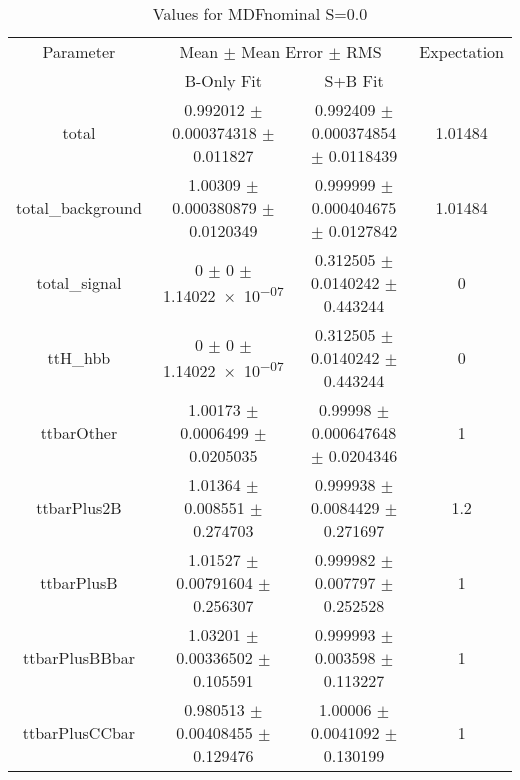 \begin{table}
\centering
\caption{Values for MDFnominal S=0.0}
\begin{tabular}{cccc}
\toprule
Parameter & \multicolumn{2}{c}{Mean $\pm$ Mean Error $\pm$ RMS} & Expectation\\
 & B-Only Fit & S+B Fit & \\
\midrule
total & \num{0.992012} $\pm$ \num{0.000374318} $\pm$ \num{0.011827} & \num{0.992409} $\pm$ \num{0.000374854} $\pm$ \num{0.0118439} & \num{1.01484}\\
total\_background & \num{1.00309} $\pm$ \num{0.000380879} $\pm$ \num{0.0120349} & \num{0.999999} $\pm$ \num{0.000404675} $\pm$ \num{0.0127842} & \num{1.01484}\\
total\_signal & \num{0} $\pm$ \num{0} $\pm$ \num{1.14022e-07} & \num{0.312505} $\pm$ \num{0.0140242} $\pm$ \num{0.443244} & \num{0}\\
ttH\_hbb & \num{0} $\pm$ \num{0} $\pm$ \num{1.14022e-07} & \num{0.312505} $\pm$ \num{0.0140242} $\pm$ \num{0.443244} & \num{0}\\
ttbarOther & \num{1.00173} $\pm$ \num{0.0006499} $\pm$ \num{0.0205035} & \num{0.99998} $\pm$ \num{0.000647648} $\pm$ \num{0.0204346} & \num{1}\\
ttbarPlus2B & \num{1.01364} $\pm$ \num{0.008551} $\pm$ \num{0.274703} & \num{0.999938} $\pm$ \num{0.0084429} $\pm$ \num{0.271697} & \num{1.2}\\
ttbarPlusB & \num{1.01527} $\pm$ \num{0.00791604} $\pm$ \num{0.256307} & \num{0.999982} $\pm$ \num{0.007797} $\pm$ \num{0.252528} & \num{1}\\
ttbarPlusBBbar & \num{1.03201} $\pm$ \num{0.00336502} $\pm$ \num{0.105591} & \num{0.999993} $\pm$ \num{0.003598} $\pm$ \num{0.113227} & \num{1}\\
ttbarPlusCCbar & \num{0.980513} $\pm$ \num{0.00408455} $\pm$ \num{0.129476} & \num{1.00006} $\pm$ \num{0.0041092} $\pm$ \num{0.130199} & \num{1}\\
\bottomrule
\end{tabular}
\end{table}